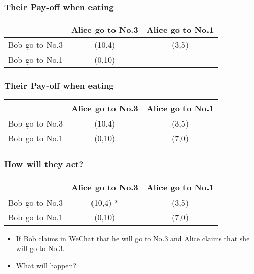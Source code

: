 \documentclass{beamer}
\begin{document}
\begin{frame}
\frametitle{Their Pay-off when eating}
\begin{tabular}{|c|c|c|}
\hline
\hline
    & {\color{red}Alice} go to No.3 & {\color{red}Alice} go to No.1\\
\hline
{\color{blue}Bob} go to No.3 & ({\color{blue}10},{\color{red}4}) & ({\color{blue}3},{\color{red}5})\\
\hline
{\color{blue}Bob} go to No.1 & ({\color{blue}0},{\color{red}10}) & \\
\hline
\hline
\end{tabular}
\end{frame}

\begin{frame}
\frametitle{Their Pay-off when eating}
\begin{tabular}{|c|c|c|}
\hline
\hline
    & {\color{red}Alice} go to No.3 & {\color{red}Alice} go to No.1\\
\hline
{\color{blue}Bob} go to No.3 & ({\color{blue}10},{\color{red}4}) & ({\color{blue}3},{\color{red}5})\\
\hline
{\color{blue}Bob} go to No.1 & ({\color{blue}0},{\color{red}10}) & ({\color{blue}7},{\color{red}0})\\
\hline
\hline
\end{tabular}
\end{frame}

\begin{frame}
\frametitle{How will they act?}
\begin{tabular}{|c|c|c|}
\hline
\hline
    & {\color{red}Alice} go to No.3 & {\color{red}Alice} go to No.1\\
\hline
{\color{blue}Bob} go to No.3 & ({\color{blue}10},{\color{red}4}) {\color{green}*}& ({\color{blue}3},{\color{red}5})\\
\hline
{\color{blue}Bob} go to No.1 & ({\color{blue}0},{\color{red}10}) & ({\color{blue}7},{\color{red}0})\\
\hline
\hline
\end{tabular}
\begin{itemize}
\item  
If {\color{blue}Bob} claims in WeChat that he will go to No.3 and {\color{red}Alice} claims that she will go to No.3.

\item What will happen?
\end{itemize}
\end{frame}
\end{document}
